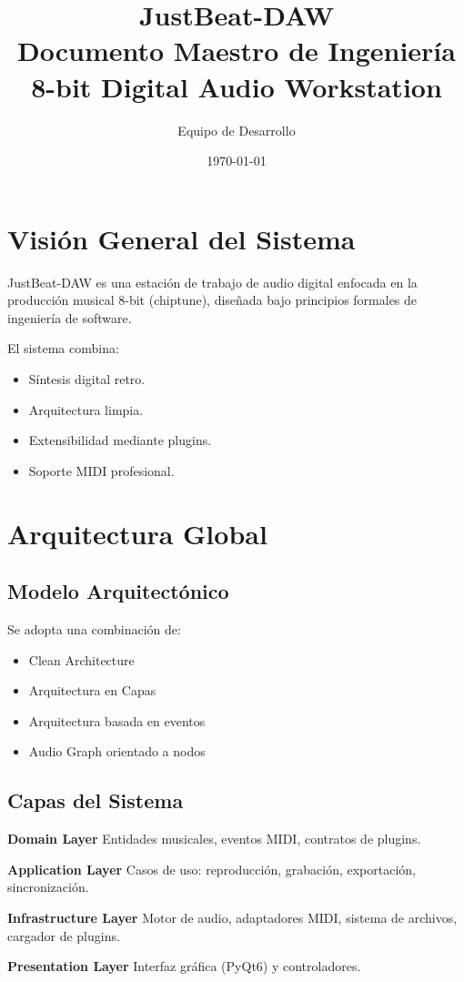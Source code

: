 \documentclass[12pt]{article}
\title{\textbf{\textcolor{primary}{JustBeat-DAW}}\\
\large Documento Maestro de Ingeniería\\
8-bit Digital Audio Workstation}
\author{Equipo de Desarrollo}
\date{\today}
\begin{document}
\maketitle
\tableofcontents
\newpage

\section{Visión General del Sistema}

JustBeat-DAW es una estación de trabajo de audio digital enfocada en la producción musical 8-bit (chiptune), diseñada bajo principios formales de ingeniería de software.

El sistema combina:
\begin{itemize}
    \item Síntesis digital retro.
    \item Arquitectura limpia.
    \item Extensibilidad mediante plugins.
    \item Soporte MIDI profesional.
\end{itemize}

\section{Arquitectura Global}

\subsection{Modelo Arquitectónico}

Se adopta una combinación de:

\begin{itemize}
    \item Clean Architecture
    \item Arquitectura en Capas
    \item Arquitectura basada en eventos
    \item Audio Graph orientado a nodos
\end{itemize}

\subsection{Capas del Sistema}

\begin{tcolorbox}[colback=softblue,colframe=primary,title=Capas Principales]

\textbf{Domain Layer}  
Entidades musicales, eventos MIDI, contratos de plugins.

\textbf{Application Layer}  
Casos de uso: reproducción, grabación, exportación, sincronización.

\textbf{Infrastructure Layer}  
Motor de audio, adaptadores MIDI, sistema de archivos, cargador de plugins.

\textbf{Presentation Layer}  
Interfaz gráfica (PyQt6) y controladores.

\end{tcolorbox}
\end{document}
